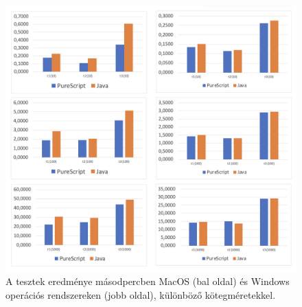 \documentclass[12pt]{article}
\begin{document}
\begin{figure}[h!]
	\includegraphics[width=\textwidth]{diagrams}
	\caption{A tesztek eredménye másodpercben MacOS (bal oldal) és Windows operációs rendszereken (jobb oldal),  különböző kötegméretekkel.}
\end{figure}
\end{document}

